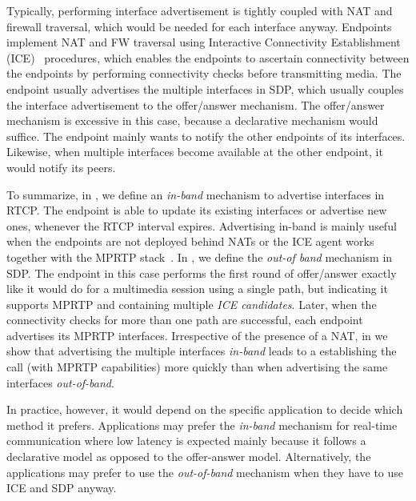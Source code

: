 
Typically, performing interface advertisement is tightly coupled with NAT and
firewall traversal, which would be needed for each interface anyway. Endpoints
implement NAT and FW traversal using Interactive Connectivity Establishment
(ICE)~\cite{rfc5245} procedures, which enables the endpoints to ascertain
connectivity between the endpoints by performing connectivity checks before
transmitting media. The endpoint usually advertises the multiple interfaces in
SDP, which usually couples the interface advertisement to the offer/answer
mechanism. The offer/answer mechanism is excessive in this case, because a
declarative mechanism would suffice. The endpoint mainly wants to notify the
other endpoints of its interfaces. Likewise, when multiple interfaces become
available at the other endpoint, it would notify its peers.

To summarize, in \cite{draft.mprtp}, we define an \emph{in-band} mechanism to
advertise interfaces in RTCP. The endpoint is able to update its existing
interfaces or advertise new ones, whenever the RTCP interval expires.
Advertising in-band is mainly useful when the endpoints are not deployed
behind NATs or the ICE agent works together with the MPRTP
stack~\cite{draft.mice}. In \cite{draft.mprtp.sdp}, we define the \emph{out-of
band} mechanism in SDP. The endpoint in this case performs the first round of
offer/answer exactly like it would do for a multimedia session using a single
path, but indicating it supports MPRTP and containing multiple \emph{ICE
candidates}. Later, when the connectivity checks for more than one path are
successful, each endpoint advertises its MPRTP interfaces. Irrespective of the
presence of a NAT, in  we show that advertising the multiple
interfaces \emph{in-band} leads to a establishing the call (with MPRTP
capabilities) more quickly than when advertising the same interfaces
\emph{out-of-band}.

In practice, however, it would depend on the specific application to decide
which method it prefers. Applications may prefer the \emph{in-band} mechanism
for real-time communication where low latency is expected mainly because it
follows a declarative model as opposed to the offer-answer model.
Alternatively, the applications may prefer to use the \emph{out-of-band}
mechanism when they have to use ICE and SDP anyway.


